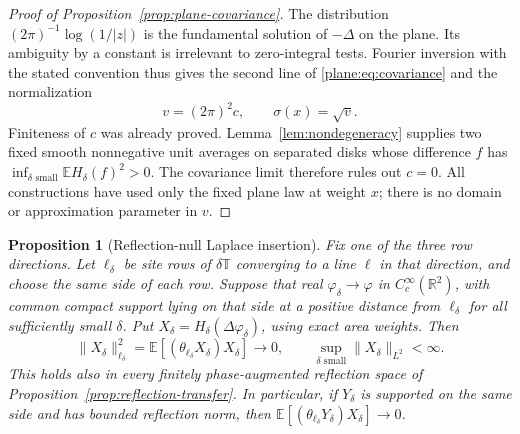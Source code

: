 \documentclass[11pt]{article}
\newcommand{\T}{\mathbb T}
\newcommand{\R}{\mathbb R}
\newcommand{\E}{\mathbb E}
\newtheorem{proposition}[theorem]{Proposition}
\theoremstyle{definition}
\theoremstyle{remark}
\numberwithin{equation}{section}
\begin{document}
\begin{proof}[Proof of Proposition~\ref{prop:plane-covariance}]
The distribution $(2\pi)^{-1}\log(1/|z|)$ is the fundamental
solution of $-\Delta$ on the plane.  Its ambiguity by a constant is
irrelevant to zero-integral tests.  Fourier inversion with the stated
convention thus gives the second line of \eqref{plane:eq:covariance}
and the normalization
\begin{equation}
 \label{plane:eq:normalization}
 v=(2\pi)^2c,\qquad \sigma(x)=\sqrt v.
\end{equation}
Finiteness of $c$ was already proved.  Lemma~\ref{lem:nondegeneracy}
supplies two fixed smooth nonnegative unit averages on separated
disks whose difference $f$ has
$\inf_{\delta\text{ small}}\E H_\delta(f)^2>0$.
The covariance limit therefore rules out $c=0$.
All constructions have used only the fixed plane law at weight $x$;
there is no domain or approximation parameter in $v$.
\end{proof}

\begin{proposition}[Reflection-null Laplace insertion]
\label{prop:reflection-null}
Fix one of the three row directions.  Let $\ell_\delta$ be site rows
of $\delta\T$ converging to a line $\ell$ in that direction, and
choose the same side of each row.  Suppose that real
$\varphi_\delta\to\varphi$ in $C_c^\infty(\R^2)$, with common
compact support lying on that side at a positive distance from
$\ell_\delta$ for all sufficiently small $\delta$.  Put
$X_\delta=H_\delta(\Delta\varphi_\delta)$, using exact area weights.
Then
\begin{equation}
 \label{plane:eq:reflection-null}
 \|X_\delta\|_{\ell_\delta}^2
   =\E[(\theta_{\ell_\delta}X_\delta)X_\delta]
       \longrightarrow0,
 \qquad \sup_{\delta\text{ small}}\|X_\delta\|_{L^2}<\infty.
\end{equation}
This holds also in every finitely phase-augmented reflection space of
Proposition~\ref{prop:reflection-transfer}.  In particular, if
$Y_\delta$ is supported on the same side and has bounded reflection
norm, then
$\E[(\theta_{\ell_\delta}Y_\delta)X_\delta]\to0$.
\end{proposition}
\end{document}
